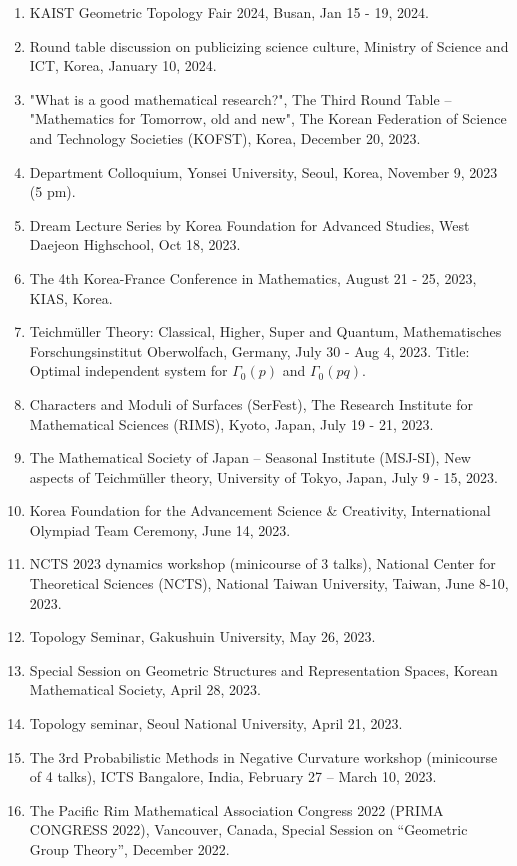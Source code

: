 \documentclass[11pt,a4paper]{article}
\begin{document}
\begin{enumerate}[leftmargin=1.5em, label=\arabic*.]
\item KAIST Geometric Topology Fair 2024, Busan, Jan 15 - 19, 2024.
\item Round table discussion on publicizing science culture, Ministry of Science and ICT, Korea, January 10, 2024.
\item "What is a good mathematical research?", The Third Round Table -- "Mathematics for Tomorrow, old and new", The Korean Federation of Science and Technology Societies (KOFST), Korea, December 20, 2023.
\item Department Colloquium, Yonsei University, Seoul, Korea, November 9, 2023 (5 pm).
\item Dream Lecture Series by Korea Foundation for Advanced Studies, West Daejeon Highschool, Oct 18, 2023.
\item The 4th Korea-France Conference in Mathematics, August 21 - 25, 2023, KIAS, Korea.
\item Teichmüller Theory: Classical, Higher, Super and Quantum, Mathematisches Forschungsinstitut Oberwolfach, Germany, July 30 - Aug 4, 2023. Title: Optimal independent system for $\Gamma_0(p)$ and $\Gamma_0(pq)$.
\item Characters and Moduli of Surfaces (SerFest), The Research Institute for Mathematical Sciences (RIMS), Kyoto, Japan, July 19 - 21, 2023.
\item The Mathematical Society of Japan -- Seasonal Institute (MSJ-SI), New aspects of Teichmüller theory, University of Tokyo, Japan, July 9 - 15, 2023.
\item Korea Foundation for the Advancement Science \& Creativity, International Olympiad Team Ceremony, June 14, 2023.
\item NCTS 2023 dynamics workshop (minicourse of 3 talks), National Center for Theoretical Sciences (NCTS), National Taiwan University, Taiwan, June 8-10, 2023.
\item Topology Seminar, Gakushuin University, May 26, 2023.
\item Special Session on Geometric Structures and Representation Spaces, Korean Mathematical Society, April 28, 2023.
\item Topology seminar, Seoul National University, April 21, 2023.
\item The 3rd Probabilistic Methods in Negative Curvature workshop (minicourse of 4 talks), ICTS Bangalore, India, February 27 -- March 10, 2023.
\item The Pacific Rim Mathematical Association Congress 2022 (PRIMA CONGRESS 2022), Vancouver, Canada, Special Session on ``Geometric Group Theory'', December 2022.

\end{enumerate}
\end{document}
